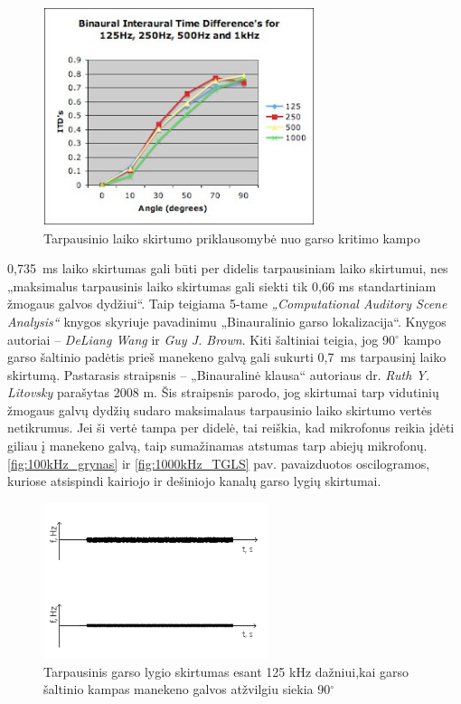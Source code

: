 \documentclass[]{vgtuef}
\begin{document}
\begin{figure}[!ht]
  \centering
  \includegraphics[width=300px]{img/TLS_degree.png}
  \caption{Tarpausinio laiko skirtumo priklausomybė nuo garso kritimo kampo}
  \label{fig:TLS_degree}
\end{figure}

0,735~ms laiko skirtumas gali būti per didelis tarpausiniam laiko skirtumui, nes „maksimalus tarpausinis laiko skirtumas gali siekti tik 0,66 ms standartiniam žmogaus galvos dydžiui“. Taip teigiama 5-tame \textit{„Computational Auditory Scene Analysis“} knygos  skyriuje pavadinimu „Binauralinio garso lokalizacija“. Knygos autoriai – \textit{DeLiang Wang} ir \textit{Guy J. Brown}. Kiti šaltiniai teigia, jog 90$^\circ$ kampo garso šaltinio padėtis prieš manekeno galvą gali sukurti 0,7~ms tarpausinį laiko skirtumą. Pastarasis straipsnis – „Binauralinė klausa“ autoriaus dr. \textit{Ruth Y. Litovsky} parašytas 2008 m. Šis straipsnis parodo, jog skirtumai tarp vidutinių žmogaus galvų dydžių sudaro maksimalaus tarpausinio laiko skirtumo vertės netikrumus. Jei ši vertė tampa per didelė, tai reiškia, kad mikrofonus reikia įdėti giliau į manekeno galvą, taip sumažinamas atstumas tarp abiejų mikrofonų. \ref{fig:100kHz_grynas} ir \ref{fig:1000kHz_TGLS} pav. pavaizduotos oscilogramos, kuriose atsispindi kairiojo ir dešiniojo kanalų garso lygių skirtumai.

\begin{figure}[!h]
  \centering
  \includegraphics[width=250px]{img/125kHz_TGLS.png}
  \caption{Tarpausinis garso lygio skirtumas esant 125 kHz dažniui,\newline kai garso šaltinio kampas manekeno galvos atžvilgiu siekia 90$^\circ$}
  \label{fig:125kHz_TGLS}
\end{figure}
\end{document}
